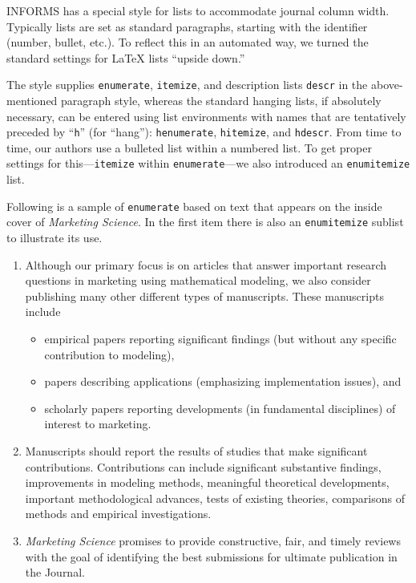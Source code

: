 \documentclass[ijds,nonblindrev]{informs4}
\begin{document}
INFORMS has a special style for lists to accommodate journal column width. 
Typically lists are set as standard paragraphs, starting with the identifier 
(number, bullet, etc.). To reflect this in an automated way, we turned the 
standard settings for LaTeX lists ``upside down.''

The style supplies \texttt{enumerate}, \texttt{itemize}, and 
description lists \texttt{descr} in the above-mentioned paragraph style, 
whereas the standard hanging lists, if absolutely necessary, can be entered 
using list environments with names that are tentatively preceded by
``\texttt{h}'' (for ``hang''): \texttt{henumerate}, \texttt{hitemize}, and  
\texttt{hdescr}. From time to time, our authors use a bulleted list 
within a numbered list. To get proper settings for
this---\texttt{itemize}  within \texttt{enumerate}---we also
introduced an \texttt{enumitemize} list. 

Following is a sample of \texttt{enumerate} based on text that appears on 
the inside cover of {\it Marketing Science}. In the first item there
is also an \texttt{enumitemize} sublist to illustrate its use. 
\begin{enumerate}
\item Although our primary focus is on articles that answer important
research questions in marketing using mathematical modeling, we also
consider publishing many other different types of manuscripts. These
manuscripts include
\begin{itemize}
\item empirical papers reporting significant findings (but without any specific 
contribution to modeling),

\item papers describing applications (emphasizing implementation issues), and

\item scholarly papers reporting developments (in fundamental disciplines) of 
interest to marketing.
\end{itemize}

\item Manuscripts should report the results of studies that make significant 
contributions. Contributions can include significant substantive findings, 
improvements in modeling methods, meaningful theoretical developments, 
important methodological advances, tests of existing theories, comparisons 
of methods and empirical investigations.

\item {\it Marketing Science} promises to provide constructive, fair, and timely reviews with the goal of 
identifying the best submissions for ultimate publication in the Journal.
\end{enumerate}
\end{document}
